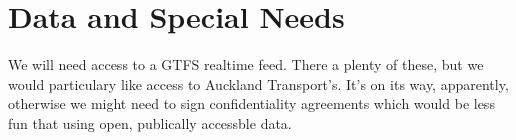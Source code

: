 \documentclass[12pt,a4paper]{article}
\begin{document}
\section{Data and Special Needs}
\label{sec:data}






















We will need access to a GTFS realtime feed.
There a plenty of these, but we would particulary like access to Auckland Transport's.
It's on its way, apparently, otherwise we might need to sign confidentiality agreements which would be less 
fun that using open, publically accessble data.
\end{document}
